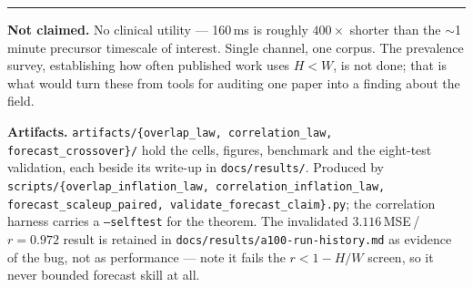 \documentclass[10pt]{article}
\begin{document}
\vspace{2pt}\hrule\vspace{3pt}
\noindent\small
\textbf{Not claimed.} No clinical utility --- 160\,ms is roughly $400\times$ shorter
than the $\sim$1\,minute precursor timescale of interest. Single channel, one
corpus. The prevalence survey, establishing how often published work uses $H<W$,
is not done; that is what would turn these from tools for auditing one paper
into a finding about the field.

\vspace{3pt}
\noindent\scriptsize
\textbf{Artifacts.} \texttt{artifacts/\{overlap\_law, correlation\_law,
forecast\_crossover\}/} hold the cells, figures, benchmark and the eight-test
validation, each beside its write-up in \texttt{docs/results/}. Produced by
\texttt{scripts/\{overlap\_inflation\_law, correlation\_inflation\_law,
forecast\_scaleup\_paired, validate\_forecast\_claim\}.py}; the correlation
harness carries a \texttt{--selftest} for the theorem. The invalidated
$3.116$\,MSE\,/\,$r{=}0.972$ result is retained in
\texttt{docs/results/a100-run-history.md} as evidence of the bug, not as
performance --- note it fails the $r<1-H/W$ screen, so it never bounded forecast
skill at all.
\end{document}
